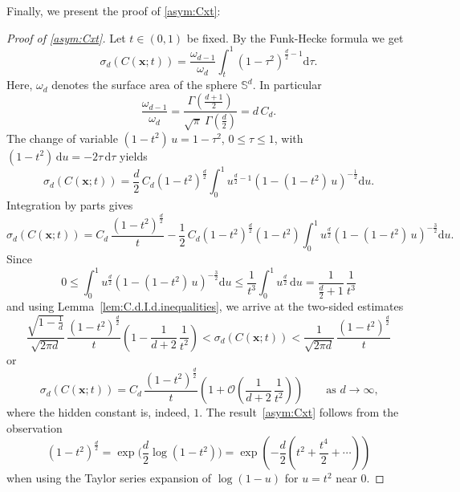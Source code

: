 \documentclass[12pt]{article}
\begin{document}
\begin{appendix}
Finally, we present the proof of \eqref{asym:Cxt}:
\begin{proof}[Proof of \eqref{asym:Cxt}]
Let $t \in (0,1)$ be fixed. By the Funk-Hecke formula \cite{M06} we get
\begin{equation*}
\sigma_d(C(\bm{x};t)) = \frac{\omega_{d-1}}{\omega_d} \int_t^1 (1-\tau^2)^{\frac{d}{2}-1} \mathrm{d} \tau.   
\end{equation*}
Here, $\omega_d$ denotes the surface area of the sphere $\mathbb{S}^d$. In particular
\begin{equation*}
\frac{\omega_{d-1}}{\omega_d} = \frac{\Gamma(\tfrac{d+1}{2})}{\sqrt{\pi}\  \Gamma(\frac{d}{2})} = d \, C_d. 
\end{equation*}
The change of variable $(1-t^2) \, u = 1 - \tau^2$, $0 \leq \tau \leq 1$, with $(1-t^2) \, \mathrm{d} u = - 2 \tau \, \mathrm{d} \tau$ yields
\begin{equation*}
\sigma_d(C(\bm{x};t)) = \frac{d}{2} \, C_d \left( 1 - t^2 \right)^{\frac{d}{2}} \int_0^1 u^{\frac{d}{2}-1} \left( 1 - ( 1 - t^2 ) \, u \right)^{-\frac{1}{2}} \mathrm{d} u. 
\end{equation*}
Integration by parts gives
\begin{equation*}
\sigma_d(C(\bm{x};t)) = C_d \, \frac{( 1 - t^2 )^{\frac{d}{2}}}{t} - \frac{1}{2} \, C_d \left( 1 - t^2 \right)^{\frac{d}{2}} \left( 1 - t^2 \right) \int_0^1 u^{\frac{d}{2}} \left( 1 - ( 1 - t^2 ) \, u \right)^{-\frac{3}{2}} \mathrm{d} u.
\end{equation*}
Since
\begin{equation*}
0 \leq \int_0^1 u^{\frac{d}{2}} \left( 1 - ( 1 - t^2 ) \, u \right)^{-\frac{3}{2}} \mathrm{d} u \leq \frac{1}{t^3} \int_0^1 u^{\frac{d}{2}} \, \mathrm{d} u = \frac{1}{\tfrac{d}{2}+1} \, \frac{1}{t^3} 
\end{equation*}
and using Lemma~\ref{lem:C.d.I.d.inequalities}, we arrive at the two-sided estimates
\begin{equation}
\label{eq:sigma.d.estimate}
\frac{\sqrt{1 - \tfrac{1}{d}}}{\sqrt{2\pi d}} \, \frac{( 1 - t^2 )^{\frac{d}{2}}}{t} \left( 1  - \frac{1}{d+2} \, \frac{1}{t^2} \right) 
<
\sigma_d(C(\bm{x};t))
<
\frac{1}{\sqrt{2\pi d}} \, \frac{( 1 - t^2 )^{\frac{d}{2}}}{t}
\end{equation}
or
\begin{equation*}
\sigma_d(C(\bm{x};t)) = C_d \, \frac{( 1 - t^2 )^{\frac{d}{2}}}{t} \left( 1 + \mathcal{O}\left( \frac{1}{d+2} \, \frac{1}{t^2} \right) \right) \qquad \text{as $d \to \infty$,}
\end{equation*}
where the hidden constant is, indeed, $1$. The result~\eqref{asym:Cxt} follows from the observation
\begin{equation*}
\left( 1 - t^2 \right)^{\frac{d}{2}} 
= 
\exp\Big( \frac{d}{2} \log( 1 - t^2 ) \Big) 
=
\exp\left( - \frac{d}{2} \left( t^2 + \frac{t^4}{2} + \cdots \right) \right)
\end{equation*}
when using the Taylor series expansion of $\log( 1 - u )$ for $u = t^2$ near $0$.
\end{proof}



\end{appendix}
\end{document}
